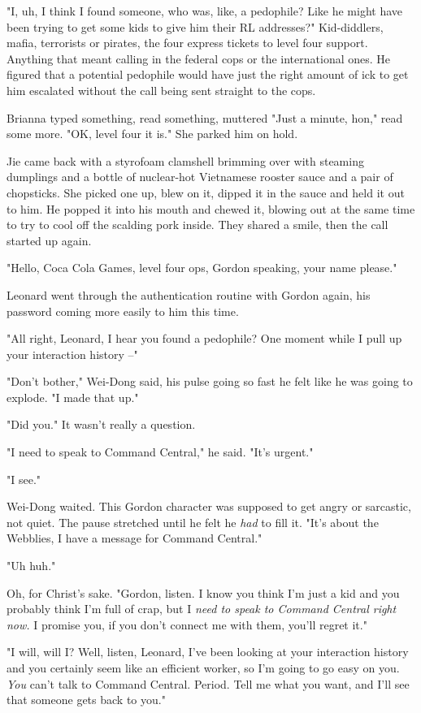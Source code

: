 "I, uh, I think I found someone, who was, like, a pedophile? Like
he might have been trying to get some kids to give him their RL
addresses?" Kid-diddlers, mafia, terrorists or pirates, the four
express tickets to level four support. Anything that meant calling
in the federal cops or the international ones. He figured that a
potential pedophile would have just the right amount of ick to get
him escalated without the call being sent straight to the cops.

Brianna typed something, read something, muttered "Just a minute,
hon," read some more. "OK, level four it is." She parked him on
hold.

Jie came back with a styrofoam clamshell brimming over with
steaming dumplings and a bottle of nuclear-hot Vietnamese rooster
sauce and a pair of chopsticks. She picked one up, blew on it,
dipped it in the sauce and held it out to him. He popped it into
his mouth and chewed it, blowing out at the same time to try to
cool off the scalding pork inside. They shared a smile, then the
call started up again.

"Hello, Coca Cola Games, level four ops, Gordon speaking, your name
please."

Leonard went through the authentication routine with Gordon again,
his password coming more easily to him this time.

"All right, Leonard, I hear you found a pedophile? One moment while
I pull up your interaction history --"

"Don't bother," Wei-Dong said, his pulse going so fast he felt like
he was going to explode. "I made that up."

"Did you." It wasn't really a question.

"I need to speak to Command Central," he said. "It's urgent."

"I see."

Wei-Dong waited. This Gordon character was supposed to get angry or
sarcastic, not quiet. The pause stretched until he felt he
\emph{had} to fill it. "It's about the Webblies, I have a message
for Command Central."

"Uh huh."

Oh, for Christ's sake. "Gordon, listen. I know you think I'm just a
kid and you probably think I'm full of crap, but I
\emph{need to speak to Command Central right now.} I promise you,
if you don't connect me with them, you'll regret it."

"I will, will I? Well, listen, Leonard, I've been looking at your
interaction history and you certainly seem like an efficient
worker, so I'm going to go easy on you. \emph{You} can't talk to
Command Central. Period. Tell me what you want, and I'll see that
someone gets back to you."

